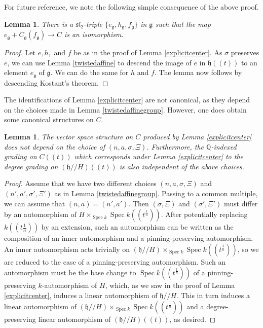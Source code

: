 \documentclass[12pt]{article}
\DeclareMathOperator{\Spec}{Spec}
\newtheorem{lemma}[theorem]{Lemma}
\theoremstyle{remark}
\begin{document}
For future reference, we note the following simple consequence of the above proof.

\begin{lemma}\label{quasisplitkostant}
There is a $\mathfrak{sl}_2$-triple $\{e_{\mathfrak{g}}, h_{\mathfrak{g}},f_{\mathfrak{g}}\}$ in $\mathfrak{g}$ such that the map $e_{\mathfrak{g}}+C_{\mathfrak{g}}(f_{\mathfrak{g}})\rightarrow C$ is an isomorphism.
\end{lemma}

\begin{proof}
Let $e,h,$ and $f$ be as in the proof of Lemma \ref{explicitcenter}. As $\sigma$ preserves $e$, we can use Lemma \ref{twistedaffine} to descend the image of $e$ in $\mathfrak{h}((t))$ to an element $e_{\mathfrak{g}}$ of $\mathfrak{g}.$ We can do the same for $h$ and $f$. The lemma now follows by descending Kostant's theorem.
\end{proof}

The identifications of Lemma \ref{explicitcenter} are not canonical, as they depend on the choices made in Lemma \ref{twistedaffinegroup}. However, one does obtain some canonical structures on $C$.

\begin{lemma}\label{canonicalstructures}
The vector space structure on $C$ produced by Lemma \ref{explicitcenter} does not depend on the choice of $(n,a,\sigma,\Xi)$.
Furthermore, the $\mathbb{Q}$-indexed grading on $C((t))$ which corresponds under Lemma \ref{explicitcenter} to the degree grading on $(\mathfrak{h}//H)((t))$ is also independent of the above choices.
\end{lemma}

\begin{proof}
Assume that we have two different choices $(n,a,\sigma,\Xi)$ and $(n',a',\sigma',\Xi')$ as in Lemma \ref{twistedaffinegroup}. Passing to a common multiple, we can assume that $(n,a)=(n',a').$ Then $(\sigma,\Xi)$ and $(\sigma',\Xi')$ must differ by an automorphism of $H\times_{\Spec k}\Spec k((t^{\frac{1}{n}})).$ After potentially replacing $k((t{\frac{1}{n}}))$ by an extension, such an automorphism can be written as the composition of an inner automorphism and a pinning-preserving automorphism. An inner automorphism acts trivially on $(\mathfrak{h}//H)\times_{\Spec k}\Spec k((t^{\frac{1}{n}}))$, so we are reduced to the case of a pinning-preserving automorphism. Such an automorphism must be the base change to $\Spec k((t^{\frac{1}{n}}))$ of a pinning-preserving $k$-automorphism of $H$, which, as we saw in the proof of Lemma \ref{explicitcenter}, induces a linear automorphism of $\mathfrak{h}//H$. This in turn induces a linear automorphism of $(\mathfrak{h}//H)\times_{\Spec k}\Spec k((t^{\frac{1}{n}}))$ and a degree-preserving linear automorphism of $(\mathfrak{h}//H)((t))$, as desired.
\end{proof}
\end{document}

